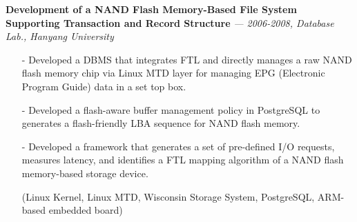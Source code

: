   {\bf Development of a NAND Flash Memory-Based File System Supporting Transaction and
      Record Structure} 
    {\it \footnotesize --- 2006-2008, Database Lab., Hanyang University}
    \begin{itemize}[leftmargin=*]
    \setlength\itemsep{-0.02in}
    \item[-] Developed a DBMS that integrates FTL and directly manages a raw NAND flash
             memory chip via Linux MTD layer for managing EPG (Electronic Program Guide)
             data in a set top box.
    \item[-] Developed a flash-aware buffer management policy in PostgreSQL
             to generates a flash-friendly LBA sequence for NAND flash memory.
    \item[-] Developed a framework that generates a set of pre-defined I/O
             requests, measures latency,
	     and identifies a FTL mapping algorithm
             of a NAND flash memory-based
             storage device.
    \item[] {\small(Linux Kernel, Linux MTD, Wisconsin Storage System, PostgreSQL,
             ARM-based embedded board)}
    \end{itemize}

